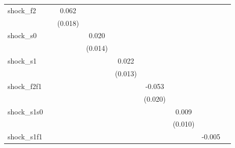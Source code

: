 {\begin{tabular}{l*{8}{c}}
\addlinespace
shock\_f2    &                     &       0.062\sym{***}&                     &                     &                     &                     &                     &                     \\
            &                     &     (0.018)         &                     &                     &                     &                     &                     &                     \\
\addlinespace
shock\_s0    &                     &                     &       0.020         &                     &                     &                     &                     &                     \\
            &                     &                     &     (0.014)         &                     &                     &                     &                     &                     \\
\addlinespace
shock\_s1    &                     &                     &                     &       0.022         &                     &                     &                     &                     \\
            &                     &                     &                     &     (0.013)         &                     &                     &                     &                     \\
\addlinespace
shock\_f2f1  &                     &                     &                     &                     &      -0.053\sym{**} &                     &                     &                     \\
            &                     &                     &                     &                     &     (0.020)         &                     &                     &                     \\
\addlinespace
shock\_s1s0  &                     &                     &                     &                     &                     &       0.009         &                     &                     \\
            &                     &                     &                     &                     &                     &     (0.010)         &                     &                     \\
\addlinespace
shock\_s1f1  &                     &                     &                     &                     &                     &                     &      -0.005         &                     \\

\end{tabular}}

